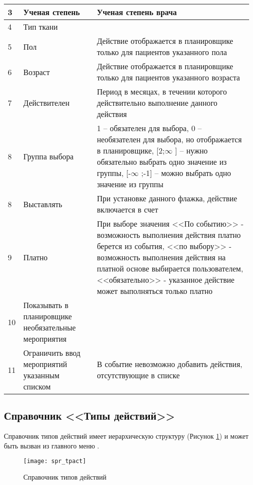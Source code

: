 {\begin{longtable}{|p{0.55cm}|p{4cm}|p{12cm}|}
3	& Ученая степень &	Ученая степень врача \\ \hline
4	& Тип ткани & \\ \hline	
5	& Пол	& Действие отображается в планировщике только для пациентов указанного пола \\ \hline
6	& Возраст	& Действие отображается в планировщике только для пациентов указанного возраста \\ \hline
7	& Действителен	& Период в месяцах, в течении которого действительно выполнение данного действия \\ \hline
8	& Группа выбора &	1 – обязателен для выбора, 0 – необязателен для выбора, но отображается в планировщике, [2;$\infty$ ] – нужно обязательно выбрать одно значение из группы, [-$\infty$ ;-1] – можно выбрать одно значение из группы \\ \hline
8	& Выставлять	& При установке данного флажка, действие включается в счет \\ \hline
9	& Платно	& При выборе значения <<По событию>> - возможность выполнения действия платно берется из события, <<по выбору>> - возможность выполнения действия на платной основе выбирается пользователем, <<обязательно>> - указанное действие может выполняться только платно \\ \hline
10	& Показывать в планировщике необязательные мероприятия & \\ \hline	
11	& Ограничить ввод мероприятий указанным списком &	В событие невозможно добавить действия, отсутствующие в списке \\ \hline
\end{longtable}
}
 
\subsection{Справочник <<Типы действий>>}

Справочник типов действий имеет иерархическую структуру (Рисунок \ref{img_spr_tpact}) и может быть вызван из главного меню .

\begin{figure}[ht]\centering
 \texttt{[image: spr\_tpact]}
 \caption{Справочник типов действий}
 \label{img_spr_tpact}
\end{figure}

